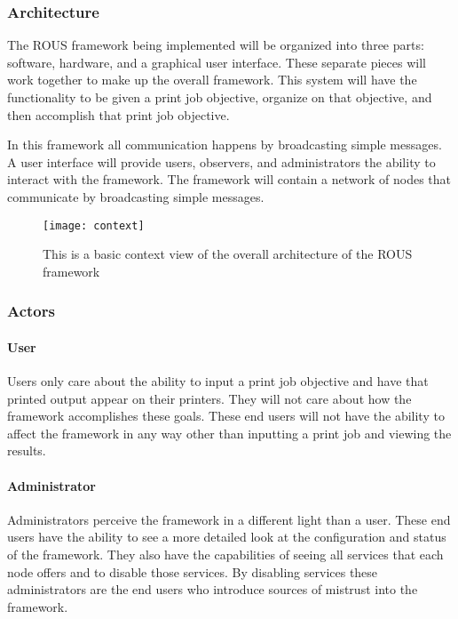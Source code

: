 \subsubsection{Architecture}
The ROUS framework being implemented will be organized into three parts: software, hardware, and a graphical user interface. These separate pieces will work together to make up the overall framework. This system will have the functionality to be given a print job objective, organize on that objective, and then accomplish that print job objective.

In this framework all communication happens by broadcasting simple messages. A user interface will provide users, observers, and administrators the ability to interact with the framework. The framework will contain a network of nodes that communicate by broadcasting simple messages. 
\begin{figure}[H]
\centering
	\texttt{[image: context]}
	\captionsetup{justification=centering}
    \caption{This is a basic context view of the overall architecture of the ROUS framework}
\end{figure}


\subsubsection{Actors}
\paragraph{User}
Users only care about the ability to input a print job objective and have that printed output appear on their printers. They will not care about how the framework accomplishes these goals. These end users will not have the ability to affect the framework in any way other than inputting a print job and viewing the results.

\paragraph{Administrator}
Administrators perceive the framework in a different light than a user. These end users have the ability to see a more detailed look at the configuration and status of the framework. They also have the capabilities of seeing all services that each node offers and to disable those services. By disabling services these administrators are the end users who introduce sources of mistrust into the framework.

